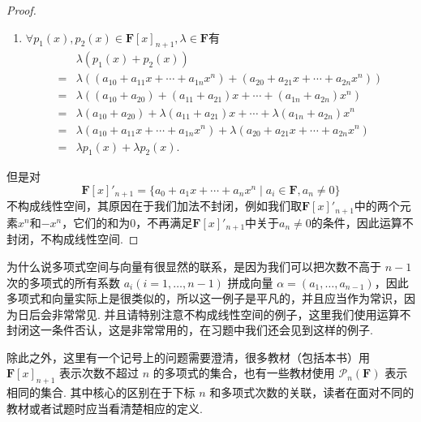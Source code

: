 \begin{proof}
\begin{enumerate}
        \item $\forall p_1(x), p_2(x) \in \mathbf{F}[x]_{n+1}, \lambda \in \mathbf{F}$有
              \begin{align*}
                      & \lambda(p_1(x) + p_2(x))                                                                        \\
                  ={} & \lambda((a_{10} + a_{11}x + \cdots + a_{1n}x^n) + (a_{20} + a_{21}x + \cdots + a_{2n}x^n))      \\
                  ={} & \lambda((a_{10} + a_{20}) + (a_{11} + a_{21})x + \cdots + (a_{1n} + a_{2n})x^n)                 \\
                  ={} & \lambda(a_{10} + a_{20}) + \lambda(a_{11} + a_{21})x + \cdots + \lambda(a_{1n} + a_{2n})x^n     \\
                  ={} & \lambda(a_{10} + a_{11}x + \cdots + a_{1n}x^n) + \lambda(a_{20} + a_{21}x + \cdots + a_{2n}x^n) \\
                  ={} & \lambda p_1(x) + \lambda p_2(x).
              \end{align*}
    \end{enumerate}
    但是对\[\mathbf{F}[x]'_{n+1}=\{a_0+a_1x+\cdots+a_nx^n \mid a_i\in\mathbf{F}, a_n\neq 0\}\]不构成线性空间，其原因在于我们加法不封闭，例如我们取$\mathbf{F}[x]'_{n+1}$中的两个元素$x^n$和$-x^n$，它们的和为$0$，不再满足$\mathbf{F}[x]'_{n+1}$中关于$a_n\neq 0$的条件，因此运算不封闭，不构成线性空间.
\end{proof}

为什么说多项式空间与向量有很显然的联系，是因为我们可以把次数不高于 $n-1$ 次的多项式的所有系数 $a_i(i=1,\ldots,n-1)$ 拼成向量 $\alpha=(a_1,\ldots,a_{n-1})$，因此多项式和向量实际上是很类似的，所以这一例子是平凡的，并且应当作为常识，因为日后会非常常见. 并且请特别注意不构成线性空间的例子，这里我们使用运算不封闭这一条件否认，这是非常常用的，在习题中我们还会见到这样的例子.

除此之外，这里有一个记号上的问题需要澄清，很多教材（包括本书）用 $\mathbf{F}[x]_{n+1}$ 表示次数不超过 $n$ 的多项式的集合，也有一些教材使用 $\mathcal{P}_n(\mathbf{F})$ 表示相同的集合. 其中核心的区别在于下标 $n$ 和多项式次数的关联，读者在面对不同的教材或者试题时应当看清楚相应的定义.

